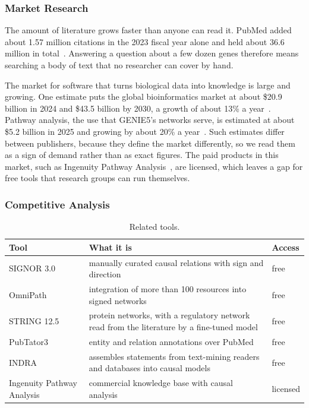 \documentclass[11pt,a4paper]{article}
\newcommand{\gen}{GENIE5}
\begin{document}
\subsubsection{Market Research}

The amount of literature grows faster than anyone can read it. PubMed added about 1.57 million
citations in the 2023 fiscal year alone and held about 36.6 million in total~\cite{nlmstats}.
Answering a question about a few dozen genes therefore means searching a body of text that no
researcher can cover by hand.

The market for software that turns biological data into knowledge is large and growing. One
estimate puts the global bioinformatics market at about \$20.9 billion in 2024 and
\$43.5 billion by 2030, a growth of about 13\% a year~\cite{bccbioinfo}. Pathway analysis, the use
that \gen{}'s networks serve, is estimated at about \$5.2 billion in 2025 and growing by about
20\% a year~\cite{gvrpathway}. Such estimates differ between publishers, because they define the
market differently, so we read them as a sign of demand rather than as exact figures. The paid
products in this market, such as Ingenuity Pathway Analysis~\cite{ipa}, are licensed, which leaves
a gap for free tools that research groups can run themselves.

\subsubsection{Competitive Analysis}

\begin{table}[htbp]
\centering
\small
\begin{tabularx}{\textwidth}{@{}lLl@{}}
\toprule
\textbf{Tool} & \textbf{What it is} & \textbf{Access}\\
\midrule
SIGNOR 3.0~\cite{signor} & manually curated causal relations with sign and direction & free\\
OmniPath~\cite{omnipath} & integration of more than 100 resources into signed networks & free\\
STRING 12.5~\cite{string} & protein networks, with a regulatory network read from the
  literature by a fine-tuned model & free\\
PubTator3~\cite{pubtator3} & entity and relation annotations over PubMed & free\\
INDRA~\cite{indra} & assembles statements from text-mining readers and databases into causal
  models & free\\
Ingenuity Pathway Analysis~\cite{ipa} & commercial knowledge base with causal analysis &
  licensed\\
\bottomrule
\end{tabularx}
\caption{Related tools.}
\end{table}
\end{document}
